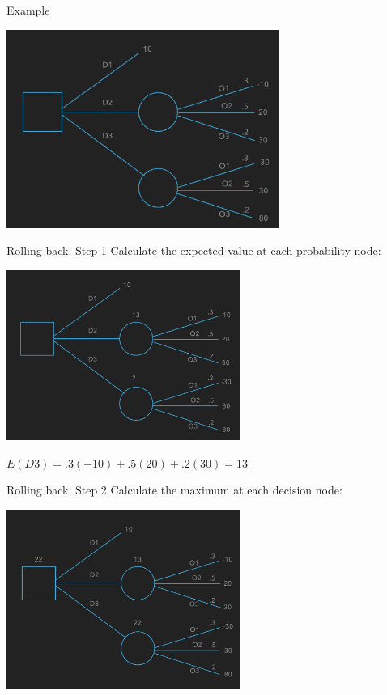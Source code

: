 \documentclass{beamer}\usepackage[]{graphicx}\usepackage[]{color}
\begin{document}
\begin{darkframes}
    \begin{frame}[fragile]{Example}
      \begin{center}
      \includegraphics[width=3.5in]{DecisionTree} 
      \end{center}
    \end{frame}     


    \begin{frame}[fragile]{Rolling back: Step 1}
      Calculate the expected value at each probability node:
      \begin{center}
      \includegraphics[width=3in]{RollingBack} 
      \end{center}

      $E(D3) = .3(-10) + .5(20) + .2(30) = 13$

      \lc %
    \end{frame}

    \begin{frame}[fragile]{Rolling back: Step 2}
      Calculate the maximum at each decision node:
      \begin{center}
      \includegraphics[width=3in]{FinalTree} 
      \end{center}


\end{frame}
\end{darkframes}
\end{document}
